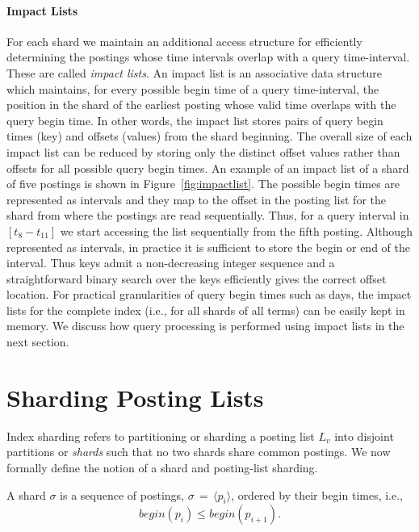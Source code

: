 \paragraph{Impact Lists} For each shard we maintain an additional access structure for efficiently determining the postings whose time intervals overlap with a query time-interval. These are called \emph{impact lists}. An impact list is an associative data structure which maintains, for every possible begin time of a query time-interval, the position in
the shard of the earliest posting whose valid time overlaps with the query begin time. In other words, the impact list stores pairs of query begin times (key) and offsets (values) from the shard beginning. The overall size of each impact list can be reduced by storing only the distinct offset values rather than offsets for all possible query begin times. An example of an impact list of a shard of five postings is shown in Figure~\ref{fig:impactlist}. The possible begin times are represented as intervals and they map to the offset in the posting list for the shard from where the postings are read sequentially. Thus, for a query interval in $[t_8 - t_{11}]$ we start accessing the list sequentially from the fifth posting. Although represented as intervals, in practice it is sufficient to store the begin or end of the interval. 
Thus keys admit a non-decreasing integer sequence and a straightforward binary search over the keys efficiently gives the correct offset location. For practical granularities of query begin times such as days, the impact lists for the complete index (i.e., for all shards of all terms) can be easily kept in memory. We discuss how query processing is performed using impact lists in the next section.


\section{Sharding Posting Lists} 
\label{chap:sharding:chap:horizontal_partitioning}
Index sharding refers to partitioning or sharding a posting list $L_v$ into disjoint partitions or \emph{shards} such that no two shards share common postings. We now formally define the notion of a shard and posting-list sharding. 

\begin{definition}[Shard]
A shard $\sigma$ is a sequence of postings, $\sigma \,=\,\langle p_i\rangle$, ordered by their begin times, i.e., 
$$
	begin(p_i) \leq begin(p_{i+1}).
$$ 
\end{definition}

